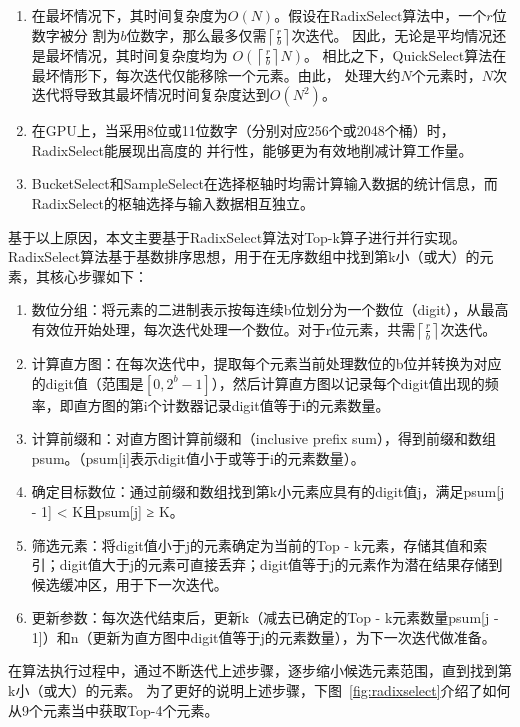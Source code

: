 \begin{enumerate}
\item 在最坏情况下，其时间复杂度为$O(N)$。假设在RadixSelect算法中，一个$r$位数字被分
割为$b$位数字，那么最多仅需$\left\lceil\frac{r}{b}\right\rceil$次迭代。
因此，无论是平均情况还是最坏情况，其时间复杂度均为
$O(\left\lceil\frac{r}{b}\right\rceil N)$。
相比之下，QuickSelect算法在最坏情形下，每次迭代仅能移除一个元素。由此，
处理大约$N$个元素时，$N$次迭代将导致其最坏情况时间复杂度达到$O(N^{2})$。

\item 在GPU上，当采用8位或11位数字（分别对应256个或2048个桶）时，RadixSelect能展现出高度的
并行性，能够更为有效地削减计算工作量。

\item BucketSelect和SampleSelect在选择枢轴时均需计算输入数据的统计信息，而RadixSelect的枢轴选择与输入数据相互独立。

\end{enumerate}
基于以上原因，本文主要基于RadixSelect算法对Top-k算子进行并行实现。
RadixSelect算法基于基数排序思想，用于在无序数组中找到第k小（或大）的元素，其核心步骤如下：
\begin{enumerate}
    \item {数位分组}：将元素的二进制表示按每连续b位划分为一个数位（digit），从最高有效位开始处理，每次迭代处理一个数位。对于r位元素，共需$\left\lceil\frac{r}{b}\right\rceil$次迭代。
    \item  {计算直方图}：在每次迭代中，提取每个元素当前处理数位的b位并转换为对应的digit值（范围是$[0, 2^{b}-1]$），然后计算直方图以记录每个digit值出现的频率，即直方图的第i个计数器记录digit值等于i的元素数量。
    \item  {计算前缀和}：对直方图计算前缀和（inclusive prefix sum），得到前缀和数组psum。（psum[i]表示digit值小于或等于i的元素数量）。
    \item  {确定目标数位}：通过前缀和数组找到第k小元素应具有的digit值j，满足psum[j - 1] < K且psum[j] ≥ K。
    \item  {筛选元素}：将digit值小于j的元素确定为当前的Top - k元素，存储其值和索引；digit值大于j的元素可直接丢弃；digit值等于j的元素作为潜在结果存储到候选缓冲区，用于下一次迭代。
    \item  {更新参数}：每次迭代结束后，更新k（减去已确定的Top - k元素数量psum[j - 1]）和n（更新为直方图中digit值等于j的元素数量），为下一次迭代做准备。
\end{enumerate}
在算法执行过程中，通过不断迭代上述步骤，逐步缩小候选元素范围，直到找到第k小（或大）的元素。
为了更好的说明上述步骤，下图~\ref{fig:radixselect}介绍了如何从9个元素当中获取Top-4个元素。

